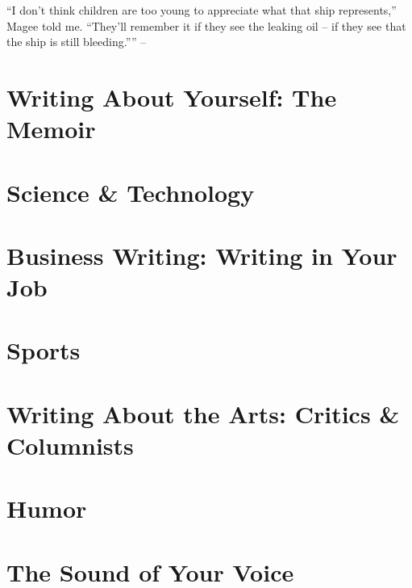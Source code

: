 \documentclass{article}
\begin{document}
``I don't think children are too young to appreciate what that ship represents,'' Magee told me. ``They'll remember it if they see the leaking oil -- if they see that the ship is still bleeding.'''' -- \cite[pp. 113--126]{Zinsser2016}


\section{Writing About Yourself: The Memoir}


\section{Science \& Technology}


\section{Business Writing: Writing in Your Job}


\section{Sports}


\section{Writing About the Arts: Critics \& Columnists}


\section{Humor}


\section{The Sound of Your Voice}
\end{document}
